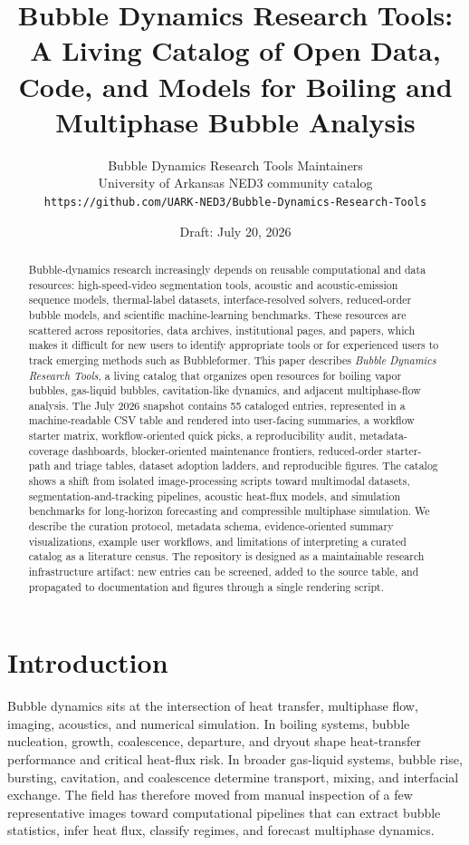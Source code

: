 \documentclass[11pt]{article}
\title{Bubble Dynamics Research Tools: A Living Catalog of Open Data, Code, and Models for Boiling and Multiphase Bubble Analysis}
\author{Bubble Dynamics Research Tools Maintainers\\
\small University of Arkansas NED3 community catalog\\
\small \texttt{https://github.com/UARK-NED3/Bubble-Dynamics-Research-Tools}}
\date{Draft: July 20, 2026}
\begin{document}
\maketitle

\begin{abstract}
Bubble-dynamics research increasingly depends on reusable computational and data resources: high-speed-video segmentation tools, acoustic and acoustic-emission sequence models, thermal-label datasets, interface-resolved solvers, reduced-order bubble models, and scientific machine-learning benchmarks. These resources are scattered across repositories, data archives, institutional pages, and papers, which makes it difficult for new users to identify appropriate tools or for experienced users to track emerging methods such as Bubbleformer. This paper describes \emph{Bubble Dynamics Research Tools}, a living catalog that organizes open resources for boiling vapor bubbles, gas-liquid bubbles, cavitation-like dynamics, and adjacent multiphase-flow analysis. The July 2026 snapshot contains 55 cataloged entries, represented in a machine-readable CSV table and rendered into user-facing summaries, a workflow starter matrix, workflow-oriented quick picks, a reproducibility audit, metadata-coverage dashboards, blocker-oriented maintenance frontiers, reduced-order starter-path and triage tables, dataset adoption ladders, and reproducible figures. The catalog shows a shift from isolated image-processing scripts toward multimodal datasets, segmentation-and-tracking pipelines, acoustic heat-flux models, and simulation benchmarks for long-horizon forecasting and compressible multiphase simulation. We describe the curation protocol, metadata schema, evidence-oriented summary visualizations, example user workflows, and limitations of interpreting a curated catalog as a literature census. The repository is designed as a maintainable research infrastructure artifact: new entries can be screened, added to the source table, and propagated to documentation and figures through a single rendering script.
\end{abstract}

\section{Introduction}

Bubble dynamics sits at the intersection of heat transfer, multiphase flow, imaging, acoustics, and numerical simulation. In boiling systems, bubble nucleation, growth, coalescence, departure, and dryout shape heat-transfer performance and critical heat-flux risk. In broader gas-liquid systems, bubble rise, bursting, cavitation, and coalescence determine transport, mixing, and interfacial exchange. The field has therefore moved from manual inspection of a few representative images toward computational pipelines that can extract bubble statistics, infer heat flux, classify regimes, and forecast multiphase dynamics.
\end{document}
